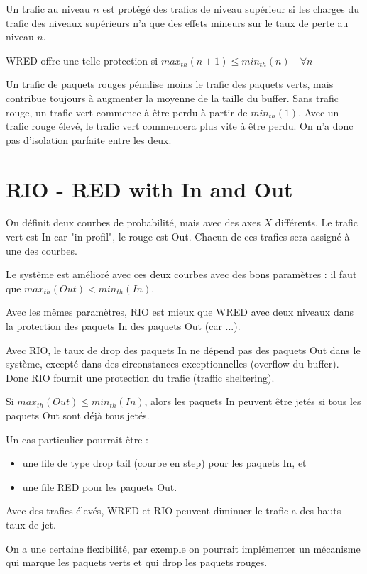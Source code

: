 			Un trafic au niveau $n$ est protégé des trafics de niveau supérieur si les charges du trafic des niveaux supérieurs n'a que des effets mineurs sur le taux de perte au niveau $n$.
			
			WRED offre une telle protection si $max_{th}(n + 1) \leq min_{th}(n) \quad \forall n$
			
			Un trafic de paquets rouges pénalise moins le trafic des paquets verts, mais contribue toujours à augmenter la moyenne de la taille du buffer. Sans trafic rouge, un trafic vert commence à être perdu à partir de $min_{th}(1)$. Avec un trafic rouge élevé, le trafic vert commencera plus vite à être perdu. On n'a donc pas d'isolation parfaite entre les deux.
			
			\section{RIO - RED with In and Out}
			
			On définit deux courbes de probabilité, mais avec des axes $X$ différents. Le trafic vert est In car "in profil", le rouge est Out. Chacun de ces trafics sera assigné à une des courbes.
			
			Le système est amélioré avec ces deux courbes avec des bons paramètres : il faut que $max_{th}(Out) < min_{th}(In)$. 
			
			
			Avec les mêmes paramètres, RIO est mieux que WRED avec deux niveaux dans la protection des paquets In des paquets Out (car ...).
			
			Avec RIO, le taux de drop des paquets In ne dépend pas des paquets Out dans le système, excepté dans des circonstances exceptionnelles (overflow du buffer). Donc RIO fournit une protection du trafic (traffic sheltering).
			
			Si $max_{th}(Out) \leq min_{th}(In)$, alors les paquets In peuvent être jetés si tous les paquets Out sont déjà tous jetés.
			
			Un cas particulier pourrait être :
			
			\begin{itemize}
				\item une file de type drop tail (courbe en step) pour les paquets In, et
				\item une file RED pour les paquets Out.
			\end{itemize}
			
			
			Avec des trafics élevés, WRED et RIO peuvent diminuer le trafic a des hauts taux de jet.			
			
			On a une certaine flexibilité, par exemple on pourrait implémenter un mécanisme qui marque les paquets verts et qui drop les paquets rouges.
			
